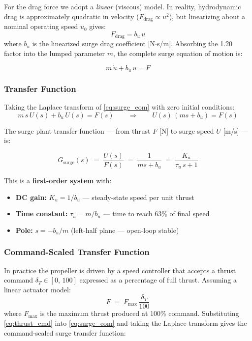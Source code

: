 \documentclass[../../book.tex]{subfiles}
\begin{document}
For the drag force we adopt a \emph{linear} (viscous) model.  In reality,
hydrodynamic drag is approximately quadratic in velocity
($F_{\mathrm{drag}} \propto u^2$), but linearizing about a nominal operating
speed $u_0$ gives:
\[
  F_{\mathrm{drag}} = b_u\,u
\]
where $b_u$ is the linearized surge drag coefficient [N$\cdot$s/m].
Absorbing the 1.20 factor into the lumped parameter $m$, the complete
surge equation of motion is:

\begin{equation}
  \boxed{m\,\dot{u} + b_u\,u = F}
  \label{eq:surge_eom}
\end{equation}

\subsubsection{Transfer Function}

Taking the Laplace transform of \eqref{eq:surge_eom} with zero initial
conditions:
\[
  m\,s\,U(s) + b_u\,U(s) = F(s)
  \qquad\Longrightarrow\qquad
  U(s)\,(ms + b_u) = F(s)
\]

The surge plant transfer function --- from thrust $F$ [N] to surge speed
$U$ [m/s] --- is:

\begin{equation}
  G_{\mathrm{surge}}(s)
  \;=\; \frac{U(s)}{F(s)}
  \;=\; \frac{1}{ms + b_u}
  \;=\; \frac{K_u}{\tau_u\,s + 1}
  \label{eq:Gsurge}
\end{equation}

This is a \textbf{first-order system} with:

\begin{itemize}
  \item \textbf{DC gain:} \;$K_u = 1/b_u$ \;[m\,s$^{-1}$/N]
        --- steady-state speed per unit thrust
  \item \textbf{Time constant:} \;$\tau_u = m/b_u$ \;[s]
        --- time to reach 63\% of final speed
  \item \textbf{Pole:} \;$s = -b_u/m$ \;(left-half plane --- open-loop stable)
\end{itemize}

\subsubsection{Command-Scaled Transfer Function}

In practice the propeller is driven by a speed controller that accepts a
thrust command $\delta_T \in [0,\,100]$ expressed as a percentage of full
thrust.  Assuming a linear actuator model:
\begin{equation}
  F \;=\; F_{\max}\,\frac{\delta_T}{100}
  \label{eq:thrust_cmd}
\end{equation}
where $F_{\max}$ is the maximum thrust produced at 100\% command.
Substituting \eqref{eq:thrust_cmd} into \eqref{eq:surge_eom} and taking the
Laplace transform gives the command-scaled surge transfer function:
\end{document}
